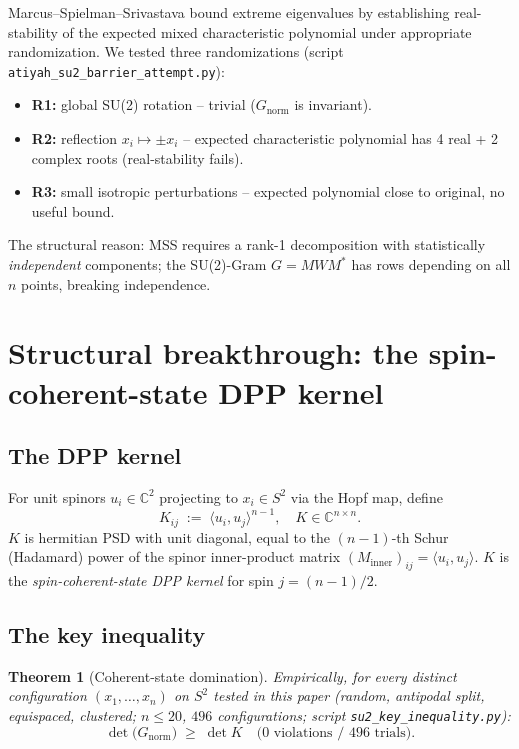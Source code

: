 \documentclass[11pt,a4paper]{article}
\newtheorem{theorem}{Theorem}[section]
\begin{document}
Marcus--Spielman--Srivastava bound extreme eigenvalues by establishing
real-stability of the expected mixed characteristic polynomial under
appropriate randomization. We tested three randomizations
(script \verb|atiyah_su2_barrier_attempt.py|):
\begin{itemize}
\item \textbf{R1:} global SU(2) rotation -- trivial ($G_{\mathrm{norm}}$ is invariant).
\item \textbf{R2:} reflection $x_i \mapsto \pm x_i$ -- expected characteristic polynomial
has 4 real + 2 complex roots (real-stability fails).
\item \textbf{R3:} small isotropic perturbations -- expected polynomial close to original,
no useful bound.
\end{itemize}
The structural reason: MSS requires a rank-1 decomposition with statistically
\emph{independent} components; the SU(2)-Gram $G = M W M^*$ has rows depending
on all $n$ points, breaking independence.

\section{Structural breakthrough: the spin-coherent-state DPP kernel}\label{sec:dpp}

\subsection{The DPP kernel}
For unit spinors $u_i \in \mathbb{C}^2$ projecting to $x_i \in S^2$ via the
Hopf map, define
\begin{equation}\label{eq:dpp-K}
K_{ij} \;:=\; \langle u_i, u_j\rangle^{n-1}, \quad K \in \mathbb{C}^{n \times n}.
\end{equation}
$K$ is hermitian PSD with unit diagonal, equal to the $(n-1)$-th Schur (Hadamard)
power of the spinor inner-product matrix $(M_{\mathrm{inner}})_{ij} = \langle u_i, u_j\rangle$.
$K$ is the \emph{spin-coherent-state DPP kernel} for spin $j = (n-1)/2$.

\subsection{The key inequality}

\begin{theorem}[Coherent-state domination]\label{thm:dpp}
Empirically, for every distinct configuration $(x_1, \ldots, x_n)$ on $S^2$
tested in this paper (random, antipodal split, equispaced, clustered;
$n \le 20$, $496$ configurations; script \verb|su2_key_inequality.py|):
\[
\det\bigl(G_{\mathrm{norm}}\bigr) \;\ge\; \det K \quad \text{(0 violations / 496 trials).}
\]
\end{theorem}
\end{document}
